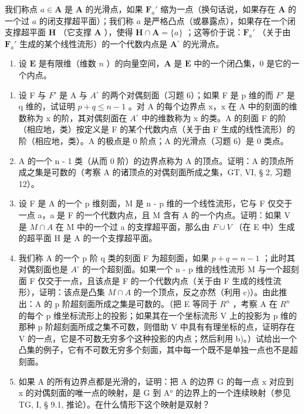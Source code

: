 我们称点 \(a \in \mathbf{A}\) 是 \(\mathbf{A}\) 的光滑点，如果 \(\mathbf{F}_a'\) 缩为一点（换句话说，如果存在 \(\mathbf{A}\) 的一个过 \(a\) 的闭支撑超平面）；我们称 \(a\) 是严格凸点（或暴露点），如果存在一个闭支撑超平面 \(\mathbf{H}\) （它支撑 \(\mathbf{A}\) ），使得 \(\mathbf{H} \cap \mathbf{A} = \{a\}\) ；这等价于说：\(\mathbf{F}_a'\) （关于由 \(\mathbf{F}_a'\) 生成的某个线性流形）的一个代数内点是 \(\mathbf{A}^\circ\) 的光滑点。

\begin{enumerate}
\def\labelenumi{\arabic{enumi})}
\setcounter{enumi}{6}
\tightlist
\item
  设 \(\mathbf{E}\) 是有限维（维数 \(n\) ）的向量空间，\(\mathbf{A}\) 是 \(\mathbf{E}\) 中的一个闭凸集，0 是它的一个内点。
\end{enumerate}

\begin{enumerate}
\def\labelenumi{\alph{enumi})}
\item
  设 F 与 \(F'\) 是 A 与 \(A^{\circ}\) 的两个对偶刻面（习题 6）；如果 F 是 p 维的而 \(F'\) 是 q 维的，试证明 \(p + q \leqslant n - 1\) 。对 A 的每个边界点 x，x 在 A 中的刻面的维数称为 x 的阶，其对偶刻面在 \(A^{\circ}\) 中的维数称为 x 的类。A 的刻面 F 的阶（相应地，类）按定义是 F 的某个代数内点（关于由 F 生成的线性流形）的阶（相应地，类）。A 的极点是 0 阶点；A 的光滑点（习题 6）是 0 类点。
\item
  A 的一个 n - 1 类（从而 0 阶）的边界点称为 A 的顶点。证明：A 的顶点所成之集是可数的（考察 A 的诸顶点的对偶刻面所成之集，GT, VI, § 2, 习题 12）。
\item
  设 F 是 A 的一个 p 维刻面，M 是 n - p 维的一个线性流形，它与 F 仅交于一点 a，a 是 F 的一个代数内点，且 M 含有 A 的一个内点。证明：如果 V 是 \(M \cap A\) 在 M 中的一个过 a 的支撑超平面，那么由 \(F \cup V\) （在 E 中）生成的超平面 H 是 A 的一个支撑超平面。
\item
  我们称 A 的一个 p 阶 q 类的刻面 F 为超刻面，如果 \(p + q = n - 1\) ；此时其对偶刻面也是 \(A^{\circ}\) 的一个超刻面。如果一个 n - p 维的线性流形 M 与一个超刻面 F 仅交于一点，且该点是 F 的一个代数内点（关于由 F 生成的线性流形），证明：该点是凸集 \(M \cap A\) 的一个顶点，反之亦然（利用 c)）。由此推出：A 的 p 阶超刻面所成之集是可数的。（把 E 等同于 \(R^{n}\) ，考察 A 在 \(R^{n}\) 的每个 p 维坐标流形上的投影；如果其在一个坐标流形 V 上的投影为 p 维的那种 p 阶超刻面所成之集不可数，则借助 V 中具有有理坐标的点，证明存在 V 的一点，它是不可数无穷多个这种投影的内点；然后利用 b)。）试给出一个凸集的例子，它有不可数无穷多个刻面，其中每一个既不是单独一点也不是超刻面。
\item
  如果 A 的所有边界点都是光滑的，证明：把 A 的边界 G 的每一点 x 对应到 x 的对偶刻面的唯一点的映射，是 G 到 A° 的边界上的一个连续映射（参见 TG, I, § 9.1, 推论）。在什么情形下这个映射是双射？
\end{enumerate}

